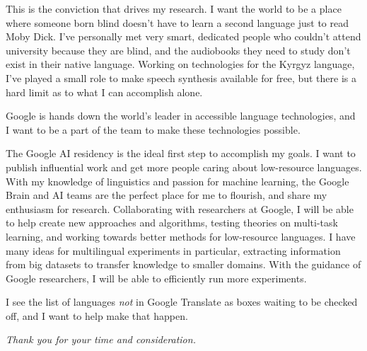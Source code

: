 \documentclass[12pt,a4paper]{article}
\begin{document}
This is the conviction that drives my research. I want the world to be a place where someone born blind doesn't have to learn a second language just to read Moby Dick. I've personally met very smart, dedicated people who couldn't attend university because they are blind, and the audiobooks they need to study don't exist in their native language. Working on technologies for the Kyrgyz language, I've played a small role to make speech synthesis available for free, but there is a hard limit as to what I can accomplish alone.

Google is hands down the world's leader in accessible language technologies, and I want to be a part of the team to make these technologies possible. 

The Google AI residency is the ideal first step to accomplish my goals. I want to publish influential work and get more people caring about low-resource languages. With my knowledge of linguistics and passion for machine learning, the Google Brain and AI teams are the perfect place for me to flourish, and share my enthusiasm for research. Collaborating with researchers at Google, I will be able to help create new approaches and algorithms, testing theories on multi-task learning, and working towards better methods for low-resource languages. I have many ideas for multilingual experiments in particular, extracting information from big datasets to transfer knowledge to smaller domains. With the guidance of Google researchers, I will be able to efficiently run more experiments.

I see the list of languages \textit{not} in Google Translate as boxes waiting to be checked off, and I want to help make that happen.

\begin{center}
\textit{Thank you for your time and consideration.}  
\end{center}
\end{document}
